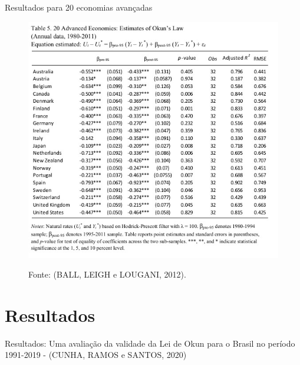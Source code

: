 \documentclass[11pt]{beamer}
\begin{document}
\begin{frame}{Resultados para 20 economias avançadas}

\begin{figure}[H]
	\centering
	\label{fig:tabela_5}
	\includegraphics[height = 0.65\textheight, width=0.65\linewidth]{"Figuras/tabela_5.jpeg"} \\
\caption*{\small Fonte: (BALL, LEIGH e LOUGANI, 2012).}
\end{figure}

\end{frame}

\section{Resultados}

\begin{frame}{}

\centering Resultados: Uma avaliação da validade da Lei de Okun para o Brasil no período 1991-2019  - (CUNHA, RAMOS e SANTOS, 2020)

\end{frame}
\end{document}
